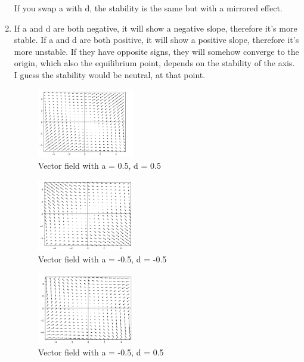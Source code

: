 \documentclass[12pt]{article}
\begin{document}
\begin{enumerate}[label=\alph*.]
      If you swap a with d, the stability is the same but with a mirrored effect.
      \item If a and d are both negative, it will show a negative slope, therefore it's more stable. If a and d are both positive, it will show a positive slope, therefore it's more unstable. If they have opposite signs, they will somehow converge to the origin, which also the equilibrium point, depends on the stability of the axis. I guess the stability would be neutral, at that point.
      \begin{figure}[H]
        \centering
        \includegraphics[width=0.4\textwidth]{vector5.png} %
        \caption{Vector field with a = 0.5, d = 0.5}
        \label{fig:vector5}
        \end{figure}
        \begin{figure}[H]
            \centering
            \includegraphics[width=0.4\textwidth]{vector6.png} %
            \caption{Vector field with a = -0.5, d = -0.5}
        \label{fig:vector6}
        \end{figure}
        \begin{figure}[H]
            \centering
            \includegraphics[width=0.4\textwidth]{vector7.png} %
            \caption{Vector field with a = -0.5, d = 0.5}
        \label{fig:vector7}
        \end{figure}

\end{enumerate}
\end{document}
